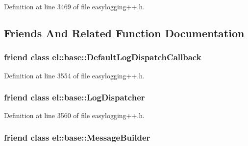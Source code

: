 Definition at line 3469 of file easylogging++.\+h.



\subsection{Friends And Related Function Documentation}
\hypertarget{classel_1_1_logger_a42b1de96d584ae4fecbfc2b9aff95052}{}
\subsubsection[{el\+::base\+::\+Default\+Log\+Dispatch\+Callback}]{\setlength{\rightskip}{0pt plus 5cm}friend class {\bf el\+::base\+::\+Default\+Log\+Dispatch\+Callback}\hspace{0.3cm}{\ttfamily [friend]}}\label{classel_1_1_logger_a42b1de96d584ae4fecbfc2b9aff95052}


Definition at line 3554 of file easylogging++.\+h.

\hypertarget{classel_1_1_logger_a9b37b28ea1c5f8f862cc89f135711d92}{}
\subsubsection[{el\+::base\+::\+Log\+Dispatcher}]{\setlength{\rightskip}{0pt plus 5cm}friend class {\bf el\+::base\+::\+Log\+Dispatcher}\hspace{0.3cm}{\ttfamily [friend]}}\label{classel_1_1_logger_a9b37b28ea1c5f8f862cc89f135711d92}


Definition at line 3560 of file easylogging++.\+h.

\hypertarget{classel_1_1_logger_a81bbf6fe31fab133d182efa8367304f1}{}
\subsubsection[{el\+::base\+::\+Message\+Builder}]{\setlength{\rightskip}{0pt plus 5cm}friend class {\bf el\+::base\+::\+Message\+Builder}\hspace{0.3cm}{\ttfamily [friend]}}\label{classel_1_1_logger_a81bbf6fe31fab133d182efa8367304f1}


